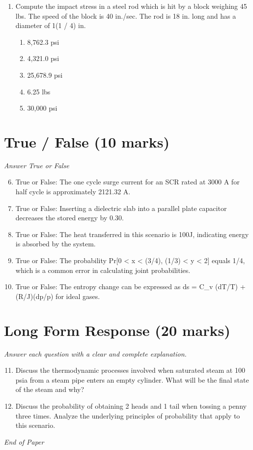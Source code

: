 \documentclass[12pt]{article}
\begin{document}
\begin{enumerate}[label=\arabic*.]
Calculate the Q-factor of theantenna.
\begin{enumerate}[label=(\alph*)]
    \item 55
    \item 50
    \item 75
    \item 85
    \item 65
\end{enumerate}
\item Compute the impact stress in a steel rod which is hit by a block weighing 45 lbs. The
speed of the block is 40 in./sec. The rod is 18 in. long and has a diameter of 1(1 / 4)
in.
\begin{enumerate}[label=(\alph*)]
    \item 8,762.3 psi
    \item 4,321.0 psi
    \item 25,678.9 psi
    \item 6.25 lbs
    \item 30,000 psi
\end{enumerate}
\end{enumerate}

\section*{True / False (10 marks)}
\textit{Answer True or False}
\begin{enumerate}[label=\arabic*.]
\setcounter{enumi}{5}
\item True or False: The one cycle surge current for an SCR rated at 3000 A for half cycle is approximately 2121.32 A.
\item True or False: Inserting a dielectric slab into a parallel plate capacitor decreases the stored energy by 0.30.
\item True or False: The heat transferred in this scenario is 100J, indicating energy is absorbed by the system.
\item True or False: The probability Pr[0 \textless{} x \textless{} (3/4), (1/3) \textless{} y \textless{} 2] equals 1/4, which is a common error in calculating joint probabilities.
\item True or False: The entropy change can be expressed as ds = C\_v (dT/T) + (R/J)(dp/p) for ideal gases.
\end{enumerate}

\section*{Long Form Response (20 marks)}
\textit{Answer each question with a clear and complete explanation.}
\begin{enumerate}[label=\arabic*.]
\setcounter{enumi}{10}
\item Discuss the thermodynamic processes involved when saturated steam at 100 psia from a steam
pipe enters an empty cylinder. What will be the final state of the steam and why?
\item Discuss the probability of obtaining 2 heads and 1 tail when tossing a penny three times.
Analyze the underlying principles of probability that apply to this scenario.
\end{enumerate}

\vfill
\noindent\textit{End of Paper}
\end{document}
